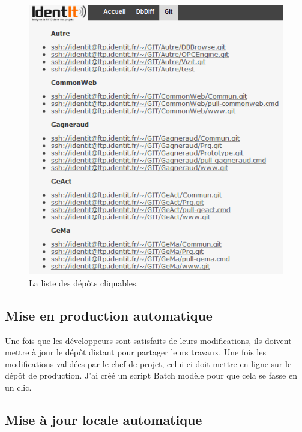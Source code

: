 \begin{figure}
    \begin{center}
        \includegraphics[scale=0.7]{images/repo.png}
        \caption{La liste des dépôts cliquables.}
        \label{repo}
    \end{center}
\end{figure}

\subsection{Mise en production automatique} %
\label{sub:Mise en production automatique}

Une fois que les développeurs sont satisfaits de leurs modifications,
ils doivent mettre à jour le dépôt distant pour partager leurs travaux.
Une fois les modifications validées par le chef de projet, celui-ci doit
mettre en ligne sur le dépôt de production. J'ai créé un script Batch
\og modèle \fg{} pour que cela se fasse en un clic.

\subsection{Mise à jour locale automatique} %
\label{sub:Mise à jour locale automatique}

